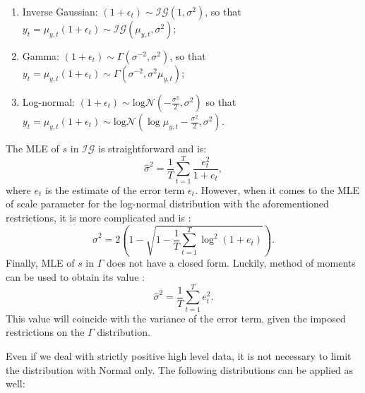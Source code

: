 \documentclass[]{book}
\providecommand{\tightlist}{%
  \setlength{\itemsep}{0pt}\setlength{\parskip}{0pt}}
\theoremstyle{definition}
\theoremstyle{definition}
\theoremstyle{definition}
\theoremstyle{definition}
\theoremstyle{remark}
\begin{document}
\begin{enumerate}
\def\labelenumi{\arabic{enumi}.}
\tightlist
\item
  Inverse Gaussian: \(\left(1+\epsilon_t \right) \sim \mathcal{IG}(1, \sigma^2)\), so that \(y_t = \mu_{y,t} (1+\epsilon_t) \sim \mathcal{IG}(\mu_{y,t}, \sigma^2)\);
\item
  Gamma: \(\left(1+\epsilon_t \right) \sim \Gamma (\sigma^{-2}, \sigma^2)\), so that \(y_t = \mu_{y,t} (1+\epsilon_t) \sim \Gamma (\sigma^{-2}, \sigma^2 \mu_{y,t})\);
\item
  Log-normal: \(\left(1+\epsilon_t \right) \sim \mathrm{log}\mathcal{N}\left(-\frac{\sigma^2}{2}, \sigma^2\right)\) so that \(y_t = \mu_{y,t} (1+\epsilon_t) \sim \mathrm{log}\mathcal{N}(\log \mu_{y,t} -\frac{\sigma^2}{2}, \sigma^2)\).
\end{enumerate}

The MLE of \(s\) in \(\mathcal{IG}\) is straightforward and is:
\begin{equation}
    \hat{\sigma}^2 = \frac{1}{T} \sum_{t=1}^{T} \frac{e_{t}^2}{1+e_t} ,
    \label{eq:ETSMultiplicativeErrorMLESigmaIG}
\end{equation}
where \(e_t\) is the estimate of the error term \(\epsilon_t\). However, when it comes to the MLE of scale parameter for the log-normal distribution with the aforementioned restrictions, it is more complicated and is \citep{Svetunkov2020ETS}:
\begin{equation}
    \hat{\sigma}^2 = 2\left(1-\sqrt{ 1-\frac{1}{T} \sum_{t=1}^{T} \log^2(1+e_{t})}\right).
    \label{eq:ETSMultiplicativeErrorMLESigmaLogN}
\end{equation}
Finally, MLE of \(s\) in \(\mathcal{\Gamma}\) does not have a closed form. Luckily, method of moments can be used to obtain its value \citep{Svetunkov2020ETS}:
\begin{equation}
    \hat{\sigma}^2 = \frac{1}{T} \sum_{t=1}^{T} e_{t}^2 .
    \label{eq:ETSMultiplicativeErrorMLESigmaGamma}
\end{equation}
This value will coincide with the variance of the error term, given the imposed restrictions on the \(\Gamma\) distribution.

Even if we deal with strictly positive high level data, it is not necessary to limit the distribution with Normal only. The following distributions can be applied as well:
\end{document}
